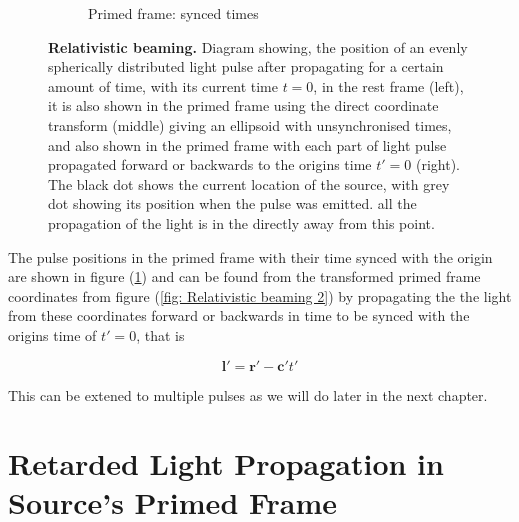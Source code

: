 \begin{figure}[H]
\begin{subfigure}{.32\textwidth}
		\caption{Primed frame: synced times}
		\label{fig: Relativistic beaming 3}
	\end{subfigure}
	\caption{\textbf{Relativistic beaming.} Diagram showing, the position of an evenly spherically distributed light pulse after propagating for a certain amount of time, with its current time ${t}=0$, in the rest frame (left), it is also shown in the primed frame using the direct coordinate transform (middle) giving an ellipsoid with unsynchronised times, and also shown in the primed frame with each part of light pulse propagated forward or backwards to the origins time $t{'}=0$ (right). The black dot shows the current location of the source, with grey dot showing its position when the pulse was emitted. all the propagation of the light is in the directly away from this point.}
	\label{fig Relativistic beaming}
\end{figure}

The pulse positions in the primed frame with their time synced with the origin are shown in figure (\ref{fig: Relativistic beaming 3}) and can be found from the transformed primed frame coordinates from figure (\ref{fig: Relativistic beaming 2}) by propagating the the light from these coordinates forward or backwards in time to be synced with the origins time of $t{'}=0$, that is

\begin{equation}
	\mathbf{l}{'} = \mathbf{r}{'} - \mathbf{c}{'} t{'}
\end{equation}

This can be extened to multiple pulses as we will do later in the next chapter.



\section{Retarded Light Propagation in Source's Primed Frame} \label{subsect: Retarded Light Propagation}

